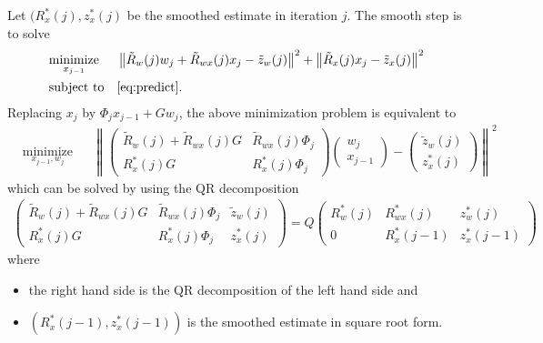 \documentclass[microtype]{gtpart}     %
\theoremstyle{definition}
\newcommand{\norm}[1]{\left\lVert#1\right\rVert}
\begin{document}
Let $(R^*_x(j), z^*_x(j)$ be the smoothed estimate in iteration $j$.
The smooth step is to solve
\begin{align*}
	& \underset{x_{j-1}}{\text{minimize}} & &\norm{\tilde{R}_w(j)w_j + \tilde{R}_{wx}(j)x_j - \tilde{z}_w(j)}^2 +
	\norm{\tilde{R}_x(j)x_j - \tilde{z}_x(j)}^2 \\
	& \text{subject to} & & \autoref{eq:predict}.
\end{align*}
Replacing $x_j$ by $\Phi_j x_{j-1} + Gw_j$, the above minimization problem is equivalent to
\begin{align*}
	& \underset{x_{j-1}, w_j}{\text{minimize}} & &\norm{
		\begin{pmatrix}
			\tilde{R}_w(j) + \tilde{R}_{wx}(j)G &\tilde{R}_{wx}(j)\Phi_j \\
			R^*_x(j)G &R^*_x(j)\Phi_j
		\end{pmatrix}
		\begin{pmatrix}
		w_j \\ x_{j-1}
		\end{pmatrix} - 
		\begin{pmatrix}
			\tilde{z}_w(j) \\ z^*_x(j)
		\end{pmatrix}}^2
\end{align*}
which can be solved by using the QR decomposition
\begin{align*}
	\begin{pmatrix}
		\tilde{R}_w(j) + \tilde{R}_{wx}(j)G &\tilde{R}_{wx}(j)\Phi_j &\tilde{z}_w(j) \\
		R^*_x(j)G &R^*_x(j)\Phi_j &z^*_x(j)
	\end{pmatrix} = Q
	\begin{pmatrix}
		R^*_w(j) &R^*_{wx}(j) &z^*_w(j) \\
		0 &R^*_x(j-1) &z^*_x(j-1)
	\end{pmatrix}
\end{align*}
where
\begin{itemize}
	\item the right hand side is the QR decomposition of the left hand side and
	\item $(R^*_x(j-1), z^*_x(j-1))$ is the smoothed estimate in square root form.
\end{itemize}


%
%
%


%


\end{document}
